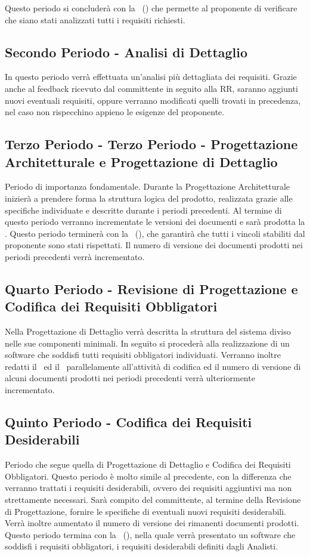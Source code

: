 \documentclass[../PianoDiProgetto_v4.0.0.tex]{subfiles}
\begin{document}
	Questo periodo si concluderà con la \revisionedeirequisiti\ () che permette al proponente di verificare che siano stati analizzati tutti i requisiti richiesti.
			
	\subsection{Secondo Periodo - Analisi di Dettaglio}
	In questo periodo verrà effettuata un'analisi più dettagliata dei requisiti. Grazie anche al feedback ricevuto dal committente in seguito alla RR, saranno aggiunti nuovi eventuali requisiti, oppure verranno modificati quelli trovati in precedenza, nel caso non rispecchino appieno le esigenze del proponente.
		
	\subsection{Terzo Periodo - Terzo Periodo - Progettazione Architetturale e Progettazione di Dettaglio}
	Periodo di importanza fondamentale. Durante la Progettazione Architetturale inizierà a prendere forma la struttura logica del prodotto, realizzata grazie alle specifiche individuate e descritte durante i periodi precedenti. Al termine di questo periodo verranno incrementate le versioni dei documenti e sarà prodotta la . Questo periodo terminerà con la \revisionediprogettazione\ (), che garantirà che tutti i vincoli stabiliti dal proponente sono stati rispettati. Il numero di versione dei documenti prodotti nei periodi precedenti verrà incrementato.
		
	\subsection{Quarto Periodo - Revisione di Progettazione e Codifica dei Requisiti Obbligatori}
	Nella Progettazione di Dettaglio verrà descritta la struttura del sistema diviso nelle sue componenti minimali. In seguito si procederà alla realizzazione di un software che soddisfi tutti requisiti obbligatori individuati. Verranno inoltre redatti il \manualeutente\ ed il \manualesviluppatore\ parallelamente all'attività di codifica ed il numero di versione di alcuni documenti prodotti nei periodi precedenti verrà ulteriormente incrementato.
		
	\subsection{Quinto Periodo - Codifica dei Requisiti Desiderabili}
	Periodo che segue quella di Progettazione di Dettaglio e Codifica dei Requisiti Obbligatori. Questo periodo è molto simile al precedente, con la differenza che verranno trattati i requisiti desiderabili, ovvero dei requisiti aggiuntivi ma non strettamente necessari. Sarà compito del committente, al termine della Revisione di Progettazione, fornire le specifiche di eventuali nuovi requisiti desiderabili. Verrà inoltre aumentato il numero di versione dei rimanenti documenti prodotti. Questo periodo termina con la \revisionediqualifica\ (), nella quale verrà presentato un software che soddisfi i requisiti obbligatori, i requisiti desiderabili definiti dagli Analisti.
		
\end{document}
